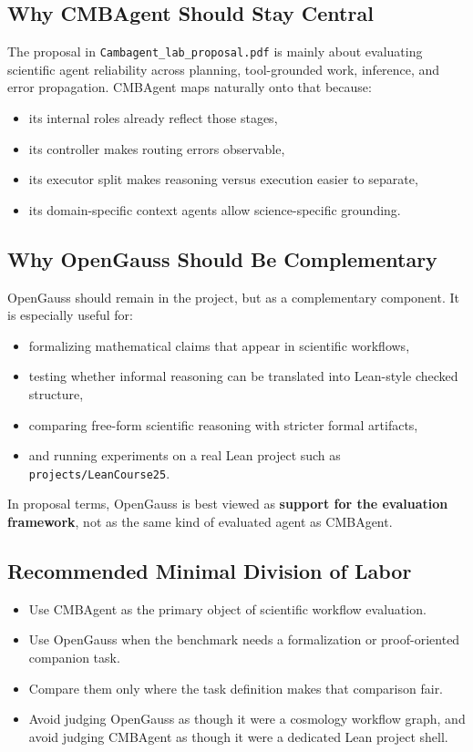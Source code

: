 \documentclass[11pt,a4paper]{article}
\begin{document}
\subsection{Why CMBAgent Should Stay Central}
The proposal in \texttt{Cambagent\_lab\_proposal.pdf} is mainly about evaluating
scientific agent reliability across planning, tool-grounded work, inference,
and error propagation. CMBAgent maps naturally onto that because:
\begin{itemize}[leftmargin=1.5em]
\item its internal roles already reflect those stages,
\item its controller makes routing errors observable,
\item its executor split makes reasoning versus execution easier to separate,
\item its domain-specific context agents allow science-specific grounding.
\end{itemize}

\subsection{Why OpenGauss Should Be Complementary}
OpenGauss should remain in the project, but as a complementary component. It is
especially useful for:
\begin{itemize}[leftmargin=1.5em]
\item formalizing mathematical claims that appear in scientific workflows,
\item testing whether informal reasoning can be translated into Lean-style
checked structure,
\item comparing free-form scientific reasoning with stricter formal artifacts,
\item and running experiments on a real Lean project such as
\texttt{projects/LeanCourse25}.
\end{itemize}

In proposal terms, OpenGauss is best viewed as \textbf{support for the
evaluation framework}, not as the same kind of evaluated agent as CMBAgent.

\subsection{Recommended Minimal Division of Labor}
\begin{itemize}[leftmargin=1.5em]
\item Use CMBAgent as the primary object of scientific workflow evaluation.
\item Use OpenGauss when the benchmark needs a formalization or proof-oriented
companion task.
\item Compare them only where the task definition makes that comparison fair.
\item Avoid judging OpenGauss as though it were a cosmology workflow graph, and
avoid judging CMBAgent as though it were a dedicated Lean project shell.
\end{itemize}
\end{document}
